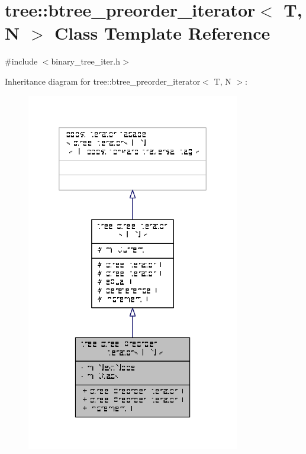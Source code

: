 \hypertarget{classtree_1_1btree__preorder__iterator}{\section{tree\-:\-:btree\-\_\-preorder\-\_\-iterator$<$ T, N $>$ Class Template Reference}
\label{classtree_1_1btree__preorder__iterator}
}


{\ttfamily \#include $<$binary\-\_\-tree\-\_\-iter.\-h$>$}



Inheritance diagram for tree\-:\-:btree\-\_\-preorder\-\_\-iterator$<$ T, N $>$\-:
\nopagebreak
\begin{figure}[H]
\begin{center}
\leavevmode
\includegraphics[width=264pt]{classtree_1_1btree__preorder__iterator__inherit__graph}
\end{center}
\end{figure}


